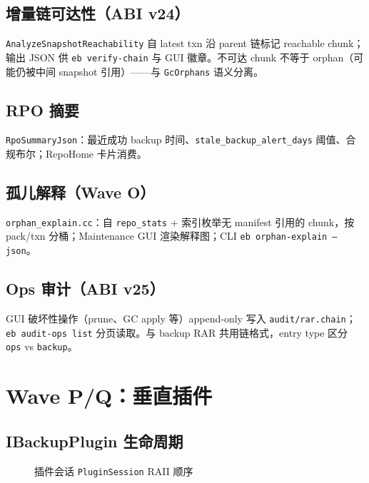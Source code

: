 \subsection{增量链可达性（ABI v24）}

\texttt{AnalyzeSnapshotReachability} 自 latest txn 沿 parent 链标记 reachable chunk；输出 JSON 供 \texttt{eb verify-chain} 与 GUI 徽章。不可达 chunk 不等于 orphan（可能仍被中间 snapshot 引用）——与 \texttt{GcOrphans} 语义分离。

\subsection{RPO 摘要}

\texttt{RpoSummaryJson}：最近成功 backup 时间、\texttt{stale\_backup\_alert\_days} 阈值、合规布尔；RepoHome 卡片消费。

\subsection{孤儿解释（Wave O）}

\texttt{orphan\_explain.cc}：自 \texttt{repo\_stats} + 索引枚举无 manifest 引用的 chunk，按 pack/txn 分桶；Maintenance GUI 渲染解释图；CLI \texttt{eb orphan-explain --json}。

\subsection{Ops 审计（ABI v25）}

GUI 破坏性操作（prune、GC apply 等）append-only 写入 \texttt{audit/rar.chain}；\texttt{eb audit-ops list} 分页读取。与 backup RAR 共用链格式，entry type 区分 \texttt{ops} vs \texttt{backup}。

\section{Wave P/Q：垂直插件}
\label{sec:cap-plugins}

\subsection{IBackupPlugin 生命周期}

\begin{figure}[htbp]
\centering
{}
\caption{插件会话 \texttt{PluginSession} RAII 顺序}
\label{fig:plugin-lifecycle}
\end{figure}

